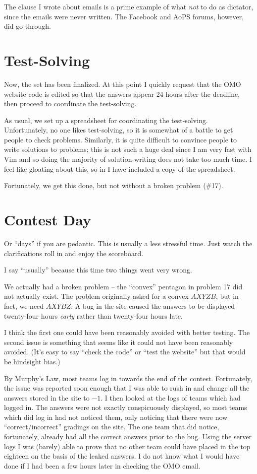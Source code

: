 \documentclass[11pt]{scrreprt}
\begin{document}
The clause I wrote about emails is a prime example of what \emph{not} to do as dictator,
since the emails were never written.
The Facebook and AoPS forums, however, did go through.


\section{Test-Solving}
Now, the set has been finalized.
At this point I quickly request that the OMO website code is edited so that the answers appear 24 hours after the deadline,
then proceed to coordinate the test-solving.

As usual, we set up a spreadsheet for coordinating the test-solving.
Unfortunately, no one likes test-solving, so it is somewhat of a battle to get people to check problems.
Similarly, it is quite difficult to convince people to write solutions to problems; this is not such a huge deal
since I am very fast with Vim and so doing the majority of solution-writing does not take too much time.
I feel like gloating about this, so in  I have included a copy of the spreadsheet.

Fortunately, we get this done, but not without a broken problem (\#17).

\section{Contest Day}
Or ``days'' if you are pedantic.
This is usually a less stressful time.
Just watch the clarifications roll in and enjoy the scoreboard.

I say ``usually'' because this time two things went very wrong.
\begin{itemize}
  \ii We actually had a broken problem -- the ``convex'' pentagon in problem 17 did not actually exist.
  The problem originally asked for a convex $AXYZB$, but in fact, we need $AXYBZ$.
  \ii A bug in the site caused the answers to be displayed twenty-four hours \emph{early}
  rather than twenty-four hours late.
\end{itemize}

I think the first one could have been reasonably avoided with better testing.
The second issue is something that seems like it could not have been reasonably avoided.
(It's easy to say ``check the code'' or ``test the website'' but that would be hindsight bias.)

By Murphy's Law, most teams log in towards the end of the contest.
Fortunately, the issue was reported soon enough that I was able to rush in and change all the answers
stored in the site to $-1$.
I then looked at the logs of teams which had logged in.
The answers were not exactly conspicuously displayed, so most teams which did log in had not noticed them,
only noticing that there were now ``correct/incorrect'' gradings on the site.
The one team that did notice, fortunately, already had all the correct answers prior to the bug.
Using the server logs I was (barely) able to prove that no other team could have placed in the top
eighteen on the basis of the leaked answers.
I do not know what I would have done if I had been a few hours later in checking the OMO email.
\end{document}
